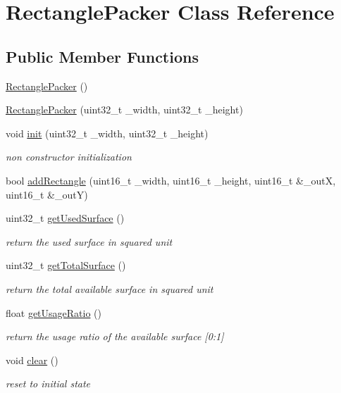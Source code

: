 \hypertarget{class_rectangle_packer}{\section{Rectangle\+Packer Class Reference}
\label{class_rectangle_packer}
}
\subsection*{Public Member Functions}
\begin{DoxyCompactItemize}
\item 
\hyperlink{class_rectangle_packer_a085a5a5e86e2a3e11848a2222489e54e}{Rectangle\+Packer} ()
\item 
\hyperlink{class_rectangle_packer_aff4a0fcb00765ac6f21684d48d5d93a6}{Rectangle\+Packer} (uint32\+\_\+t \+\_\+width, uint32\+\_\+t \+\_\+height)
\item 
void \hyperlink{class_rectangle_packer_a3aa3b8c8d4f36ab6cca66f0044870910}{init} (uint32\+\_\+t \+\_\+width, uint32\+\_\+t \+\_\+height)
\begin{DoxyCompactList}\small\item\em non constructor initialization \end{DoxyCompactList}\item 
bool \hyperlink{class_rectangle_packer_a3b08f7cff97b1c1bfb6052e743628919}{add\+Rectangle} (uint16\+\_\+t \+\_\+width, uint16\+\_\+t \+\_\+height, uint16\+\_\+t \&\+\_\+out\+X, uint16\+\_\+t \&\+\_\+out\+Y)
\item 
uint32\+\_\+t \hyperlink{class_rectangle_packer_a789511a029a766f0c1976e54b1d3a69f}{get\+Used\+Surface} ()
\begin{DoxyCompactList}\small\item\em return the used surface in squared unit \end{DoxyCompactList}\item 
uint32\+\_\+t \hyperlink{class_rectangle_packer_a63cc81c1bd5ace744a4ba40002043413}{get\+Total\+Surface} ()
\begin{DoxyCompactList}\small\item\em return the total available surface in squared unit \end{DoxyCompactList}\item 
float \hyperlink{class_rectangle_packer_af0ab36707efe5e810b96a87d933135ac}{get\+Usage\+Ratio} ()
\begin{DoxyCompactList}\small\item\em return the usage ratio of the available surface \mbox{[}0\+:1\mbox{]} \end{DoxyCompactList}\item 
void \hyperlink{class_rectangle_packer_afb92dc6a0d96dc70efeeda5f936bdef0}{clear} ()
\begin{DoxyCompactList}\small\item\em reset to initial state \end{DoxyCompactList}\end{DoxyCompactItemize}


